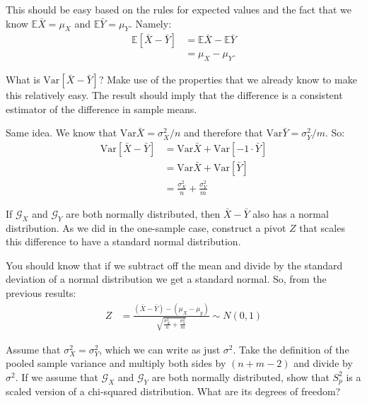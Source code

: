 
This should be easy based on the rules for expected values and the 
fact that we know $\mathbb{E}\bar{X} = \mu_X$ and $\mathbb{E}\bar{Y} = \mu_Y$.
Namely:
\begin{align*}
\mathbb{E}[\bar{X} - \bar{Y}] &= \mathbb{E}\bar{X} - \mathbb{E}\bar{Y} \\
&= \mu_X - \mu_Y.
\end{align*}


What is $\text{Var}[\bar{X} - \bar{Y}]$? Make use of the properties that we
already know to make this relatively easy. The result should imply that the
difference is a consistent estimator of the difference in sample means.


Same idea. We know that $\text{Var}\bar{X} = \sigma^2_X/n$ and therefore that
$\text{Var}\bar{Y} = \sigma^2_Y/m$. So:
\begin{align*}
\text{Var}[\bar{X} - \bar{Y}] &= \text{Var}\bar{X} + \text{Var}[-1 \cdot \bar{Y}] \\
&= \text{Var}\bar{X} + \text{Var}[\bar{Y}] \\
&= \frac{\sigma^2_X}{n} + \frac{\sigma^2_Y}{m}
\end{align*}


If $\mathcal{G}_X$ and $\mathcal{G}_Y$ are both normally distributed, then
$\bar{X} - \bar{Y}$ also has a normal distribution. As we did in the one-sample
case, construct a pivot $Z$ that scales this difference to have a standard 
normal distribution.


You should know that if we subtract off the mean and divide by the standard
deviation of a normal distribution we get a standard normal. So, from the
previous results:
\begin{align*}
Z &= \frac{(\bar{X} - \bar{Y}) - (\mu_X - \mu_y)}{\sqrt{\frac{\sigma^2_X}{n} + \frac{\sigma^2_Y}{m}}} \sim N(0, 1)
\end{align*}


Assume that $\sigma_X^2 = \sigma_Y^2$, which we can write as just $\sigma^2$.
Take the definition of the pooled sample variance and multiply both sides by
$(n + m - 2)$ and divide by $\sigma^2$. If we assume that $\mathcal{G}_X$ and
$\mathcal{G}_Y$ are both normally distributed, show that $S_p^2$ is a scaled
version of a chi-squared distribution. What are its degrees of freedom?

